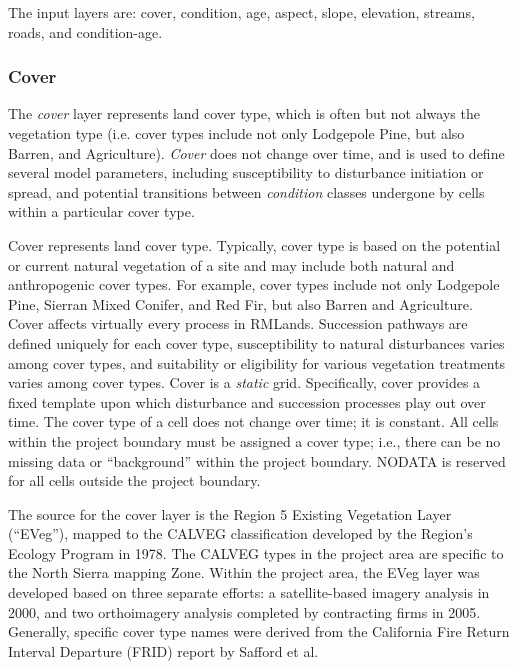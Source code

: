 The input layers are: cover, condition, age, aspect, slope, elevation, streams, roads, and condition-age.


\subsubsection{Cover} The \emph{cover} layer represents land cover type, which is often but not always the vegetation type (i.e. cover types include not only Lodgepole Pine, but also Barren, and Agriculture). \emph{Cover} does not change over time, and is used to define several model parameters, including susceptibility to disturbance initiation or spread, and potential transitions between \emph{condition} classes undergone by cells within a particular cover type.

Cover represents land cover type. Typically, cover type is based on the potential or current natural vegetation of a site and may include both natural and anthropogenic cover types. For example, cover types include not only Lodgepole Pine, Sierran Mixed Conifer, and Red Fir, but also Barren and Agriculture. Cover affects virtually every process in RMLands. Succession pathways are defined uniquely for each cover type, susceptibility to natural disturbances varies among cover types, and suitability or eligibility for various vegetation treatments varies among cover types. Cover is a \emph{static} grid. Specifically, cover provides a fixed template upon which disturbance and succession processes play out over time. The cover type of a cell does not change over time; it is constant. All cells within the project boundary must be assigned a cover type; i.e., there can be no missing data or ``background'' within the project boundary. NODATA is reserved for all cells outside the project boundary.

The source for the cover layer is the Region 5 Existing Vegetation Layer (``EVeg''), mapped to the CALVEG classification developed by the Region's Ecology Program in 1978. The CALVEG types in the project area are specific to the North Sierra mapping Zone. Within the project area, the EVeg layer was developed based on three separate efforts: a satellite-based imagery analysis in 2000, and two orthoimagery analysis completed by contracting firms in 2005. Generally, specific cover type names were derived from the California Fire Return Interval Departure (FRID) report by Safford et al. 


